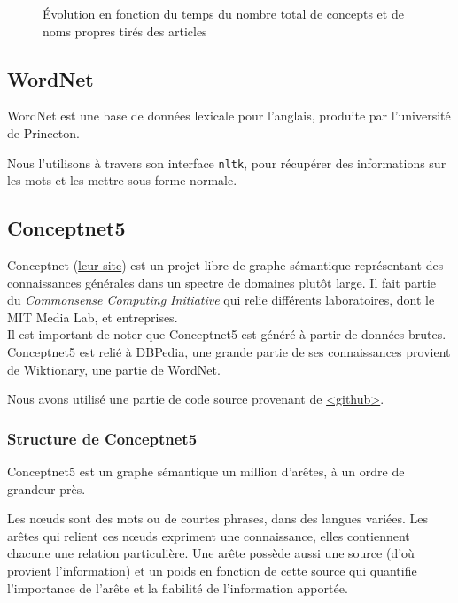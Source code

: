 \documentclass[a4paper, 12pt]{article}
\newcommand{\pyt}[1]{\texttt{#1}}%
\newcommand{\ang}[1]{\textit{#1}}%
\begin{document}
\begin{figure}[h]
 \centering
 \caption{\label{fig:conceptsnoms}Évolution en fonction du temps du nombre total de concepts et de noms propres tirés des articles}
\end{figure}



\subsection{WordNet}\label{Subsection:WordNet}

WordNet est une base de données lexicale pour l'anglais, produite par l'université de Princeton.

Nous l'utilisons à travers son interface \pyt{nltk}, pour récupérer des informations sur les mots et les mettre sous forme normale.


\subsection{Conceptnet5}\label{Subsection:Conceptnet5}

Conceptnet (\href{http://conceptnet5.media.mit.edu/}{leur site}) est un projet libre de graphe sémantique représentant des connaissances générales dans un spectre de domaines plutôt large. Il fait partie du \ang{Commonsense Computing Initiative} qui relie différents laboratoires, dont le MIT Media Lab, et entreprises.\\

Il est important de noter que Conceptnet5 est généré à partir de données brutes. Conceptnet5 est relié à DBPedia, une grande partie de ses connaissances provient de Wiktionary, une partie de WordNet.

Nous avons utilisé une partie de code source provenant de \href{https://github.com/commonsense/conceptnet5}{<github>}.


\subsubsection{Structure de Conceptnet5}

Conceptnet5 est un graphe sémantique un million d'arêtes, à un ordre de grandeur près.

Les n\oe{}uds sont des mots ou de courtes phrases, dans des langues variées. Les arêtes qui relient ces n\oe{}uds expriment une connaissance, elles contiennent chacune une relation particulière.
Une arête possède aussi une source (d'où provient l'information) et un poids en fonction de cette source qui quantifie l'importance de l'arête et la fiabilité de l'information apportée.
\end{document}
